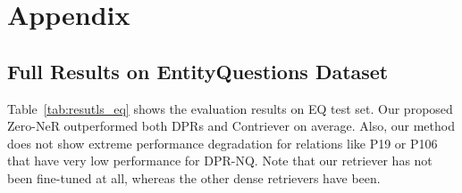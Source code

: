 \documentclass[letterpaper]{article} %
\begin{document}





\appendix
\section{Appendix}\label{sec:appendix}


\subsection{Full Results on EntityQuestions Dataset}\label{sec:appendix_full_results}
Table~\ref{tab:resutls_eq} shows the evaluation results on EQ test set.
Our proposed Zero-NeR outperformed both DPRs and Contriever on average.
Also, our method does not show extreme performance degradation for relations like P19 or P106 that have very low performance for DPR-NQ.
Note that our retriever has not been fine-tuned at all, whereas the other dense retrievers have been.
\end{document}
